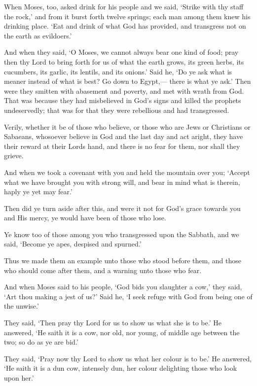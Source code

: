 \documentclass[fontsize=14pt, letterpaper, notitlepage, openany, DIV=12]{scrbook} %
\begin{document}
\noindent[2:60]
When Moses, too, asked drink for his people and we said, `Strike with thy staff the rock,'
and from it burst forth twelve springs; each man among them knew his drinking place. `Eat and
drink of what God has provided, and transgress not on the earth as evildoers.'

\noindent[2:61]
And when they said, `O Moses, we cannot always bear one kind of food; pray then thy
Lord to bring forth for us of what the earth grows, its green herbs, its cucumbers, its garlic, its
lentils, and its onions.' Said he, `Do ye ask what is meaner instead of what is best? Go down to
Egypt,--- there is what ye ask.' Then were they smitten with abasement and poverty, and met
with wrath from God. That was because they had misbelieved in God's signs and killed the
prophets undeservedly; that was for that they were rebellious and had transgressed.

\noindent[2:62]
Verily, whether it be of those who believe, or those who are Jews or Christians or
Sabaeans, whosoever believe in God and the last day and act aright, they have their reward at
their Lords hand, and there is no fear for them, nor shall they grieve.

\noindent[2:63]
And when we took a covenant with you and held the mountain over you; `Accept what
we have brought you with strong will, and bear in mind what is therein, haply ye yet may fear.'

\noindent[2:64]
Then did ye turn aside after this, and were it not for God's grace towards you and His
mercy, ye would have been of those who lose.

\noindent[2:65]
Ye know too of those among you who transgressed upon the Sabbath, and we said,
`Become ye apes, despised and spurned.'

\noindent[2:66]
Thus we made them an example unto those who stood before them, and those who should
come after them, and a warning unto those who fear.

\noindent[2:67]
And when Moses said to his people, `God bids you slaughter a cow,' they said, `Art thou
making a jest of us?' Said he, `I seek refuge with God from being one of the unwise.'

\noindent[2:68]
They said, `Then pray thy Lord for us to show us what she is to be.' He answered, `He
saith it is a cow, nor old, nor young, of middle age between the two; so do as ye are bid.'

\noindent[2:69]
They said, `Pray now thy Lord to show us what her colour is to be.' He answered, `He
saith it is a dun cow, intensely dun, her colour delighting those who look upon her.'
\end{document}
